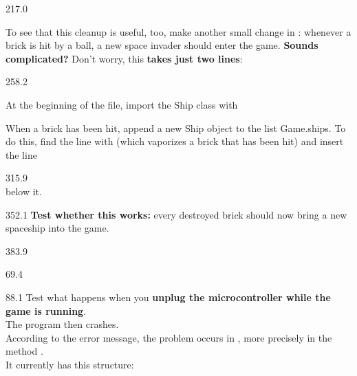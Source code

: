 \documentclass{aslab}
\begin{document}
\begin{region}[pitch=13.8]{217.0}
\begin{tasks}[start=2]
\item To see that this cleanup is useful, too, make another small change in
  : whenever a brick is hit by a ball, a new space invader
  should enter the game. \textbf{Sounds complicated?} Don't worry, this
  \textbf{takes just two lines}:
\end{tasks}
\end{region}

\begin{region}[x=74.7,right=0,pitch=13.3]{258.2}
\begin{boldsteps}
\item At the beginning of the file, import the Ship class with
\item When a brick has been hit, append a new Ship object to the list
  Game.ships. To do this, find the line with 
  (which vaporizes a brick that has been hit) and insert the line
\end{boldsteps}
\end{region}

\begin{region}[x=92.7,right=0,pitch=17.7]{315.9}
\\
below it.
\end{region}

\begin{region}[x=74.7,right=0,pitch=13.3]{352.1}
\textbf{Test whether this works:} every destroyed brick should now bring a
new spaceship into the game.
\end{region}

\begin{region}[x=74.7,right=0,pitch=13.4]{383.9}
\\
\end{region}

\nextpage
\begin{region}{69.4}
\end{region}

\begin{region}[pitch=13.38]{88.1}
Test what happens when you \textbf{unplug the microcontroller while the game
is running}.\\
The program then crashes.\\
According to the error message, the problem occurs in ,
more precisely in the method .\\
It currently has this structure:
\end{region}
\end{document}
